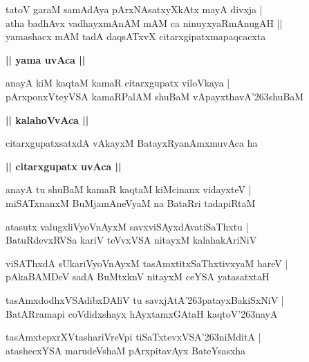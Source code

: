 \documentclass[twoside,12pt,openright]{book}
\def\S{\char'263}
\newcounter{shloka}[chapter]
\def\uvaca#1{\centerline{{\large\textbf{#1}}}}
\begin{document}
\begin{shloka}%
tatoV garaM samAdAya pArxNAsatxyXkAtx mayA divxja |\\
atha badhAvx vadhayxmAnAM mAM ca ninuyxyaRmAnugAH ||\\
yamashacx mAM tadA daqsATxvX citarxgipatxmapaqcacxta
\end{shloka}

\uvaca{|| yama uvAca ||}

\begin{shloka}%
anayA kiM kaqtaM kamaR citarxgupatx viloVkaya |\\
pArxponxVteyVSA kamaRPalAM shuBaM vApayxthavA\S shuBaM 
\end{shloka}

\uvaca{|| kalahoVvAca ||}

\begin{shloka}%
citarxgupatxsatxdA vAkayxM BatayxRyanAmxmuvAca ha 
\end{shloka}

\uvaca{|| citarxgupatx uvAca ||}

\begin{shloka}%
anayA tu shuBaM  kamaR kaqtaM kiMcinanx vidayxteV |\\
miSATxnanxM BuMjamAneVyaM na BataRri tadapiRtaM 
\end{shloka}

\begin{shloka}%
atasutx valugxliVyoVnAyxM savxviSAyxdAvatiSaThxtu |\\
BatuRdevxRVSa kariV teVvxVSA nitayxM kalahakAriNiV 
\end{shloka}

\begin{shloka}%
viSAThxdA sUkariVyoVnAyxM tasAmxtitxSaThxtivxyaM hareV |\\
pAkaBAMDeV sadA BuMtxknV nitayxM ceYSA yatasatxtaH 
\end{shloka}

\begin{shloka}%
tasAmxdodhxVSAdibxDAliV tu savxjAtA\S patayxBakiSxNiV |\\
BatARramapi coVdidxshayx hAyxtamxGAtaH kaqtoV\S nayA 
\end{shloka}

\begin{shloka}%
tasAmxtepxrXVtashariVreVpi tiSaTxtevxVSA\S niMditA |\\
atashecxYSA marudeVshaM pArxpitavAyx BateYsasxha 
\end{shloka}
\end{document}
